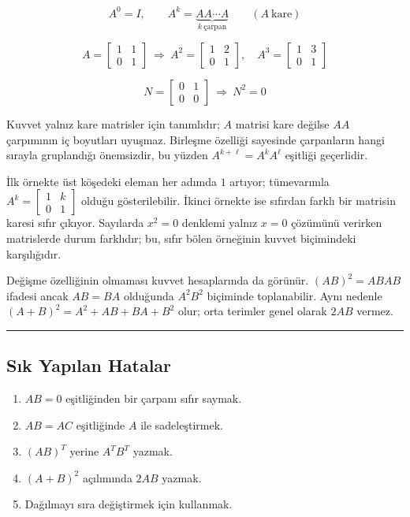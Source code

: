 \documentclass[
  letterpaper,
  DIV=11,
  numbers=noendperiod]{scrartcl}
\providecommand{\tightlist}{%
  \setlength{\itemsep}{0pt}\setlength{\parskip}{0pt}}
\begin{document}
\[
A^0=I,
\qquad
A^k=\underbrace{AA\cdots A}_{k\ \text{çarpan}}
\qquad (A\ \text{kare})
\]

\[
A=\begin{bmatrix}1&1\\0&1\end{bmatrix}
\ \Longrightarrow\
A^2=\begin{bmatrix}1&2\\0&1\end{bmatrix},
\quad
A^3=\begin{bmatrix}1&3\\0&1\end{bmatrix}
\]

\[
N=\begin{bmatrix}0&1\\0&0\end{bmatrix}
\ \Longrightarrow\
N^2=0
\]

Kuvvet yalnız kare matrisler için tanımlıdır; \(A\) matrisi kare değilse
\(AA\) çarpımının iç boyutları uyuşmaz. Birleşme özelliği sayesinde
çarpanların hangi sırayla gruplandığı önemsizdir, bu yüzden
\(A^{k+\ell}=A^kA^\ell\) eşitliği geçerlidir.

İlk örnekte üst köşedeki eleman her adımda \(1\) artıyor; tümevarımla
\(A^k=\begin{bmatrix}1&k\\0&1\end{bmatrix}\) olduğu gösterilebilir.
İkinci örnekte ise sıfırdan farklı bir matrisin karesi sıfır çıkıyor.
Sayılarda \(x^2=0\) denklemi yalnız \(x=0\) çözümünü verirken
matrislerde durum farklıdır; bu, sıfır bölen örneğinin kuvvet
biçimindeki karşılığıdır.

Değişme özelliğinin olmaması kuvvet hesaplarında da görünür.
\((AB)^2=ABAB\) ifadesi ancak \(AB=BA\) olduğunda \(A^2B^2\) biçiminde
toplanabilir. Aynı nedenle \((A+B)^2=A^2+AB+BA+B^2\) olur; orta terimler
genel olarak \(2AB\) vermez.

\begin{center}\rule{0.5\linewidth}{0.5pt}\end{center}

\subsection{Sık Yapılan Hatalar}\label{sux131k-yapux131lan-hatalar}

\begin{enumerate}
\def\labelenumi{\arabic{enumi}.}
\tightlist
\item
  \(AB=0\) eşitliğinden bir çarpanı sıfır saymak.
\item
  \(AB=AC\) eşitliğinde \(A\) ile sadeleştirmek.
\item
  \((AB)^T\) yerine \(A^TB^T\) yazmak.
\item
  \((A+B)^2\) açılımında \(2AB\) yazmak.
\item
  Dağılmayı sıra değiştirmek için kullanmak.
\end{enumerate}
\end{document}
